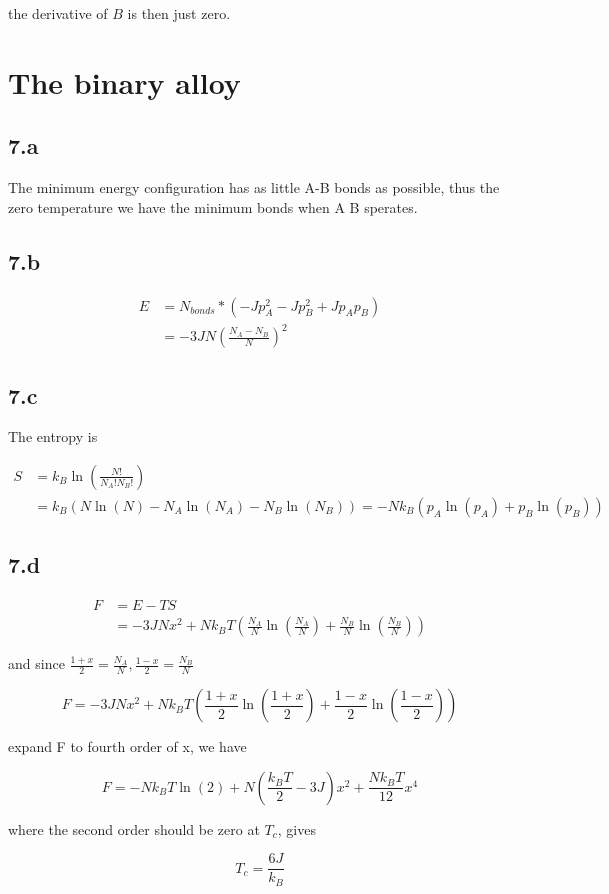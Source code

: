 \documentclass{article}
\begin{document}
the derivative of $B$ is then just zero.

\section*{The binary alloy}

\subsection*{7.a}
The minimum energy configuration has as little A-B bonds as possible, thus the zero temperature we have the minimum
bonds when A B sperates.

\subsection*{7.b}

$$
\begin{aligned}
    E &= N_{bonds} * (-J p_A^2 -Jp_B^2 + Jp_A p_B)\\
    &= -3JN(\frac{N_A - N_B}{N})^2
\end{aligned}
$$

\subsection*{7.c}
The entropy is

$$
\begin{aligned}
    S &= k_B \ln(\frac{N!}{N_A! N_B!})\\
    &= k_B (N\ln(N) - N_A \ln(N_A) - N_B \ln(N_B)) = -Nk_B (p_A \ln(p_A) + p_B\ln(p_B))
\end{aligned}
$$

\subsection*{7.d}

$$
\begin{aligned}
    F &= E - TS\\
    &= -3J N x^2 + N k_B T (\frac{N_A}{N} \ln(\frac{N_A}{N}) + \frac{N_B}{N}\ln(\frac{N_B}{N}))
\end{aligned}
$$

and since $\frac{1 + x}{2} = \frac{N_A}{N}, \frac{1 - x}{2} = \frac{N_B}{N}$

$$
F = -3JNx^2 + Nk_B T (\frac{1 + x}{2} \ln(\frac{1 + x}{2}) + \frac{1 - x}{2} \ln(\frac{1 - x}{2}))
$$

expand F to fourth order of x, we have

$$
F = -Nk_B T \ln(2) + N (\frac{k_B T}{2} - 3J) x^2 + \frac{N k_B T}{12}x^4
$$

where the second order should be zero at $T_c$, gives

$$
T_c = \frac{6J}{k_B}
$$
\end{document}
